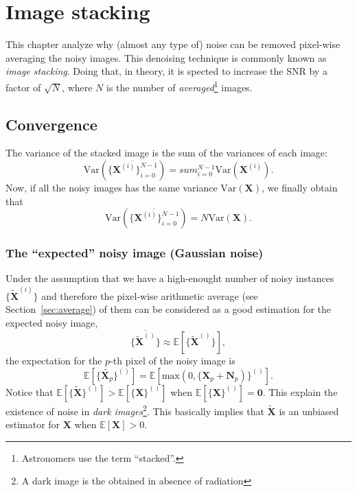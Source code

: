 \chapter{Image stacking}
This chapter analyze why (almost any type of) noise can be removed
pixel-wise averaging the noisy images. This denoising technique is
commonly known as \emph{image stacking}. Doing that, in theory, it is
spected to increase the \gls{SNR} by a factor of $\sqrt{N}$, where $N$
is the number of \emph{averaged}\footnote{Astronomers use the term
  ``stacked''.} images.


\section{Convergence}
The variance of the stacked image is the sum of the variances of each image:
\begin{equation}
  \text{Var}(\overline{\{\bm{X}^{(i)}\}_{i=0}^{N-1}}) = sum_{i=0}^{N-1}\text{Var}(\bm{X}^{(i)}).
\end{equation}
Now, if all the noisy images has the same variance
$\text{Var}(\bm{X})$, we finally obtain that
\begin{equation}
  \text{Var}(\overline{\{\bm{X}^{(i)}\}_{i=0}^{N-1}}) = N\text{Var}(\bm{X}).
\end{equation}


\subsection{The ``expected'' noisy image (Gaussian noise)}
Under the assumption that we have a high-enought number of noisy
instances $\{\tilde{\bm{X}}^{(i)}\}$ and therefore the pixel-wise
arithmetic average (see Section~\ref{sec:average}) of them can be
considered as a good estimation for the expected noisy image,
\begin{equation}
  \overline{\{\tilde{\bm{X}}^{()}\}} \approx \mathbb{E}[\{\tilde{\bm{X}}^{()}\}],
\end{equation}
the expectation for the $p$-th pixel of the noisy image is
\begin{equation}
  \mathbb{E}[\{\tilde{\bm{X}_p}\}^{()}] = \mathbb{E}[\text{max}(0, \{\bm{X}_p+\bm{N}_p)\}^{()}].
  \label{eq:E_AWG}
\end{equation}
Notice that
$\mathbb{E}[\{\tilde{\bm{X}}\}^{()}]>\mathbb{E}[\{\bm{X}\}^{()}]$ when
$\mathbb{E}[\{\bm{X}\}^{()}]=\bm{0}$. This explain the existence of
noise in \emph{dark images}\footnote{A dark image is the obtained in
  absence of radiation}. This basically implies that $\tilde{\bm{X}}$ is
an unbiased estimator for $\bm{X}$ when $\mathbb{E}[\bm{X}]>0$.

